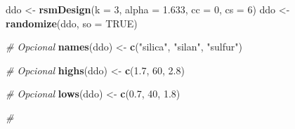 \documentclass[
]{book}
\newenvironment{Shaded}{\begin{snugshade}}{\end{snugshade}}
\newcommand{\AttributeTok}[1]{\textcolor[rgb]{0.13,0.29,0.53}{#1}}
\newcommand{\CommentTok}[1]{\textcolor[rgb]{0.56,0.35,0.01}{\textit{#1}}}
\newcommand{\ConstantTok}[1]{\textcolor[rgb]{0.56,0.35,0.01}{#1}}
\newcommand{\DecValTok}[1]{\textcolor[rgb]{0.00,0.00,0.81}{#1}}
\newcommand{\FloatTok}[1]{\textcolor[rgb]{0.00,0.00,0.81}{#1}}
\newcommand{\FunctionTok}[1]{\textcolor[rgb]{0.13,0.29,0.53}{\textbf{#1}}}
\newcommand{\NormalTok}[1]{#1}
\newcommand{\OtherTok}[1]{\textcolor[rgb]{0.56,0.35,0.01}{#1}}
\newcommand{\StringTok}[1]{\textcolor[rgb]{0.31,0.60,0.02}{#1}}
\begin{document}
\begin{Shaded}
\begin{Highlighting}[]
\NormalTok{ddo }\OtherTok{\textless{}{-}} \FunctionTok{rsmDesign}\NormalTok{(}\AttributeTok{k =} \DecValTok{3}\NormalTok{, }\AttributeTok{alpha =} \FloatTok{1.633}\NormalTok{, }\AttributeTok{cc =} \DecValTok{0}\NormalTok{, }\AttributeTok{cs =} \DecValTok{6}\NormalTok{)}
\NormalTok{ddo }\OtherTok{\textless{}{-}} \FunctionTok{randomize}\NormalTok{(ddo, }\AttributeTok{so =} \ConstantTok{TRUE}\NormalTok{)}

\CommentTok{\# Opcional}
\FunctionTok{names}\NormalTok{(ddo) }\OtherTok{\textless{}{-}} \FunctionTok{c}\NormalTok{(}\StringTok{"silica"}\NormalTok{, }\StringTok{"silan"}\NormalTok{, }\StringTok{"sulfur"}\NormalTok{)}

\CommentTok{\# Opcional}
\FunctionTok{highs}\NormalTok{(ddo) }\OtherTok{\textless{}{-}} \FunctionTok{c}\NormalTok{(}\FloatTok{1.7}\NormalTok{, }\DecValTok{60}\NormalTok{, }\FloatTok{2.8}\NormalTok{)}

\CommentTok{\# Opcional}
\FunctionTok{lows}\NormalTok{(ddo) }\OtherTok{\textless{}{-}} \FunctionTok{c}\NormalTok{(}\FloatTok{0.7}\NormalTok{, }\DecValTok{40}\NormalTok{, }\FloatTok{1.8}\NormalTok{)}

\CommentTok{\#}


\end{Highlighting}
\end{Shaded}
\end{document}
